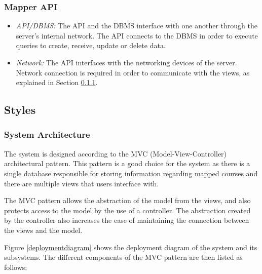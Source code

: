 \documentclass{article}
\begin{document}
    \subsubsection{Mapper API}

    \begin{itemize}
        \item \textit{API/DBMS:} The API and the DBMS interface with one another
            through the server's internal network. The API connects to the DBMS in
            order to execute queries to create, receive, update or delete data.
        \item \textit{Network:} The API interfaces with the networking devices of
            the server. Network connection is required in order to communicate with
            the views, as explained in Section \ref{sec:sysarch}.
    \end{itemize}

    \subsection{Styles}

    \subsubsection{System Architecture}
    \label{sec:sysarch}
    
    The system is designed according to the MVC (Model-View-Controller)
    architectural pattern. This pattern is a good choice for the system as
    there is a single database responsible for storing information regarding
    mapped courses and there are multiple views that users interface with.
    
    The MVC pattern allows the abstraction of the model from the views, and
    also protects access to the model by the use of a controller. The
    abstraction created by the controller also increases the ease of
    maintaining the connection between the views and the model.

    Figure \ref{deploymentdiagram} shows the deployment diagram of the system
    and its subsystems. The different components of the MVC pattern are then
    listed as follows:
\end{document}
